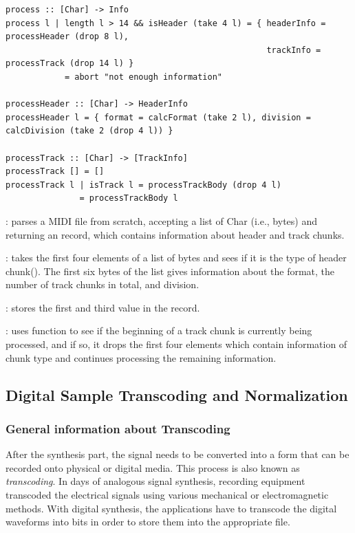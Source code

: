 \documentclass[runningheads]{llncs}
\begin{document}
\begin{lstlisting}[language=Clean,label={cod:process},caption={The \Cl{process}, \Cl{processHeader}, \Cl{processTrack} functions}, captionpos=b]
process :: [Char] -> Info
process l | length l > 14 && isHeader (take 4 l) = { headerInfo = processHeader (drop 8 l), 
	                                                 trackInfo = processTrack (drop 14 l) }
	        = abort "not enough information"
	
processHeader :: [Char] -> HeaderInfo
processHeader l = { format = calcFormat (take 2 l), division = calcDivision (take 2 (drop 4 l)) }

processTrack :: [Char] -> [TrackInfo]
processTrack [] = []
processTrack l | isTrack l = processTrackBody (drop 4 l)
               = processTrackBody l
\end{lstlisting}

\noindent {}: parses a MIDI file from scratch, accepting a list of Char (i.e., bytes) and returning an  record, which contains information about header and track chunks. 

\noindent {}: takes the first four elements of a list of bytes and sees if it is the type of header chunk(). The first six bytes of the list gives information about the format, the number of track chunks in total, and division. 

\noindent {}: stores the first and third value in the  record.

\noindent {}: uses  function to see if the beginning of a track chunk is currently being processed, and if so, it drops the first four elements which contain information of chunk type and continues processing the remaining information.

\subsection{Digital Sample Transcoding and Normalization}\label{sec:transcoding}


\subsubsection{General information about Transcoding} 
After the synthesis part, the signal needs to be converted into a form that can be recorded onto physical or digital media. This process is also known as \emph{transcoding}. In days of analogous signal synthesis, recording equipment transcoded the electrical signals using various mechanical or electromagnetic methods. With digital synthesis, the applications have to transcode the digital waveforms into bits in order to store them into the appropriate file. 
\end{document}
